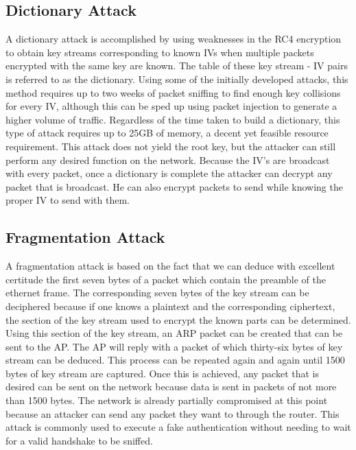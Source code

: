 \documentclass[12pt]{article}
\begin{document}
\subsection{Dictionary Attack}
A dictionary attack is accomplished by using weaknesses in the RC4 encryption to obtain key streams corresponding to known IVs when multiple packets encrypted with the same key are known. The table of these key stream - IV pairs is referred to as the dictionary. Using some of the initially developed attacks, this method requires up to two weeks of packet sniffing to find enough key collisions for every IV, although this can be sped up using packet injection to generate a higher volume of traffic. Regardless of the time taken to build a dictionary, this type of attack requires up to 25GB of memory, a decent yet feasible resource requirement. This attack does not yield the root key, but the attacker can still perform any desired function on the network.  Because the IV’s are broadcast with every packet, once a dictionary is complete the attacker can decrypt any packet that is broadcast. He can also encrypt packets to send while knowing the proper IV to send with them.

\subsection{Fragmentation Attack}
\label{sec:frag}
A fragmentation attack is based on the fact that we can deduce with excellent certitude the first seven bytes of a packet which contain the preamble of the ethernet frame.  The corresponding seven bytes of the key stream can be deciphered because if one knows a plaintext and the corresponding ciphertext, the section of the key stream used to encrypt the known parts can be determined. Using this section of the key stream, an ARP packet can be created that can be sent to the AP.  The AP will reply with a packet of which thirty-six bytes of key stream can be deduced. This process can be repeated again and again until 1500 bytes of key stream are captured. Once this is achieved, any packet that is desired can be sent on the network because data is sent in packets of not more than 1500 bytes. The network is already partially compromised at this point because an attacker can send any packet they want to through the router. This attack is commonly used to execute a fake authentication without needing to wait for a valid handshake to be sniffed.
\end{document}
